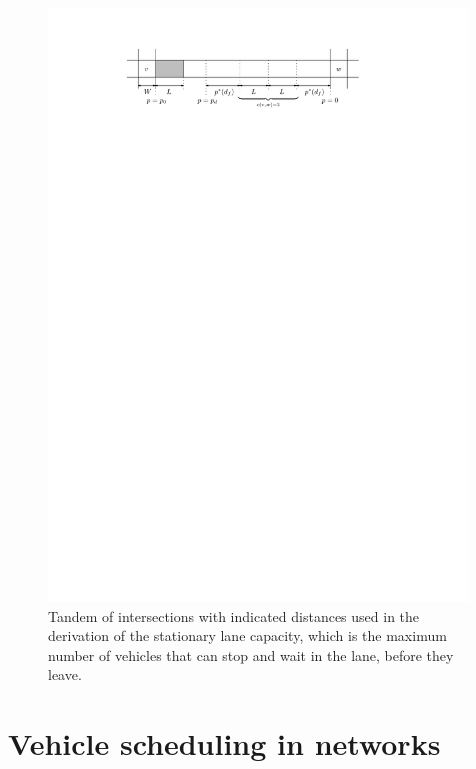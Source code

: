 \documentclass[a4paper]{article}
\theoremstyle{definition}
\theoremstyle{plain}
\begin{document}
\begin{figure}
  \centering
  \includegraphics[width=0.99\textwidth]{figures/motion/tandem_annotated}
  \caption{Tandem of intersections with indicated distances used in the
    derivation of the stationary lane capacity, which is the maximum number of
    vehicles that can stop and wait in the lane, before they leave.}
  \label{fig:tandem_annotated}
\end{figure}


\newpage

\section{Vehicle scheduling in networks}
\end{document}
